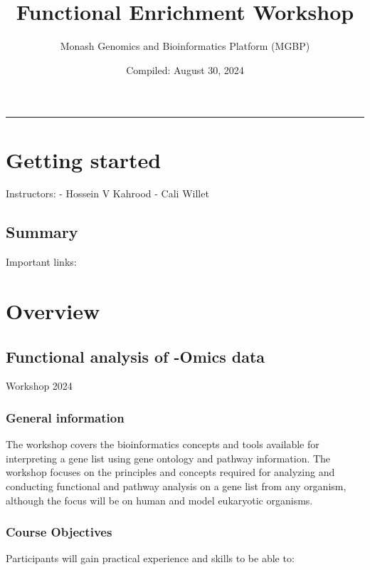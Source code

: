 \documentclass[
]{book}
\title{Functional Enrichment Workshop}
\author{Monash Genomics and Bioinformatics Platform (MGBP)}
\date{Compiled: August 30, 2024}
\begin{document}
\maketitle

{
\setcounter{tocdepth}{1}
\tableofcontents
}
\begin{center}\rule{0.5\linewidth}{0.5pt}\end{center}

\chapter{Getting started}\label{getting-started}

Instructors:
- Hossein V Kahrood
- Cali Willet

\section{Summary}\label{summary}

Important links:

\chapter{Overview}\label{overview}

\section{Functional analysis of -Omics data}\label{functional-analysis-of--omics-data}

Workshop 2024

\subsection{General information}\label{general-information}

The workshop covers the bioinformatics concepts and tools available for interpreting a gene list using gene ontology and pathway information. The workshop focuses on the principles and concepts required for analyzing and conducting functional and pathway analysis on a gene list from any organism, although the focus will be on human and model eukaryotic organisms.

\subsection{Course Objectives}\label{course-objectives}

Participants will gain practical experience and skills to be able to:
\end{document}
